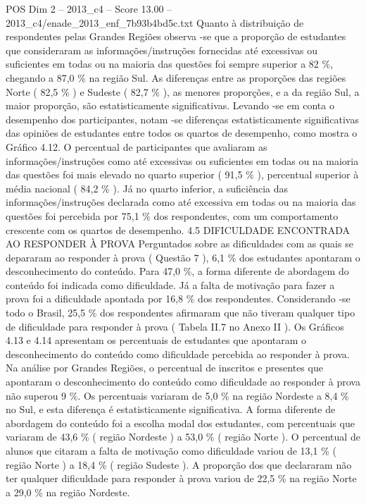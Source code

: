 \begin{textsample}{POS Dim 2 – 2013\_c4 – Score 13.00 – 2013\_c4/enade\_2013\_enf\_7b93b4bd5c.txt}
Quanto à distribuição de respondentes pelas Grandes Regiões observa -se que a proporção de estudantes que consideraram as informações/instruções fornecidas até excessivas ou suficientes em todas ou na maioria das questões foi sempre superior a 82 \%, chegando a 87,0 \% na região Sul.
As diferenças entre as proporções das regiões Norte ( 82,5 \% ) e Sudeste ( 82,7 \% ), as menores proporções, e a da região Sul, a maior proporção, são estatisticamente significativas.
Levando -se em conta o desempenho dos participantes, notam -se diferenças estatisticamente significativas das opiniões de estudantes entre todos os quartos de desempenho, como mostra o Gráfico 4.12.
O percentual de participantes que avaliaram as informações/instruções como até excessivas ou suficientes em todas ou na maioria das questões foi mais elevado no quarto superior ( 91,5 \% ), percentual superior à média nacional ( 84,2 \% ).
Já no quarto inferior, a suficiência das informações/instruções declarada como até excessiva em todas ou na maioria das questões foi percebida por 75,1 \% dos respondentes, com um comportamento crescente com os quartos de desempenho. 4.5 DIFICULDADE ENCONTRADA AO RESPONDER À PROVA Perguntados sobre as dificuldades com as quais se depararam ao responder à prova ( Questão 7 ), 6,1 \% dos estudantes apontaram o desconhecimento do conteúdo.
Para 47,0 \%, a forma diferente de abordagem do conteúdo foi indicada como dificuldade.
Já a falta de motivação para fazer a prova foi a dificuldade apontada por 16,8 \% dos respondentes.
Considerando -se todo o Brasil, 25,5 \% dos respondentes afirmaram que não tiveram qualquer tipo de dificuldade para responder à prova ( Tabela II.7 no Anexo II ).
Os Gráficos 4.13 e 4.14 apresentam os percentuais de estudantes que apontaram o desconhecimento do conteúdo como dificuldade percebida ao responder à prova.
Na análise por Grandes Regiões, o percentual de inscritos e presentes que apontaram o desconhecimento do conteúdo como dificuldade ao responder à prova não superou 9 \%.
Os percentuais variaram de 5,0 \% na região Nordeste a 8,4 \% no Sul, e esta diferença é estatisticamente significativa.
A forma diferente de abordagem do conteúdo foi a escolha modal dos estudantes, com percentuais que variaram de 43,6 \% ( região Nordeste ) a 53,0 \% ( região Norte ).
O percentual de alunos que citaram a falta de motivação como dificuldade variou de 13,1 \% ( região Norte ) a 18,4 \% ( região Sudeste ).
A proporção dos que declararam não ter qualquer dificuldade para responder à prova variou de 22,5 \% na região Norte a 29,0 \% na região Nordeste.

\end{textsample}
